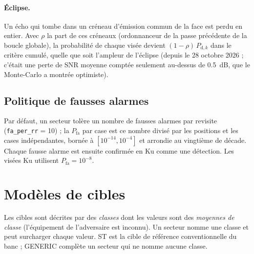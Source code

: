 \documentclass[11pt,a4paper]{article}
\newcommand{\code}[1]{\texttt{\small #1}}
\newcommand{\Pfa}{P_{\mathrm{fa}}}
\begin{document}
\paragraph{Éclipse.} Un écho qui tombe dans un créneau d'émission commun de la face est perdu en entier. Avec $\rho$ la
part de ces créneaux (ordonnanceur de la passe précédente de la boucle globale), la probabilité de chaque visée devient
$(1-\rho)\,P_{\mathrm{d},k}$ dans le critère cumulé, quelle que soit l'ampleur de l'éclipse (depuis le 28 octobre 2026 ;
c'était une perte de SNR moyenne comptée seulement au-dessus de \SI{0.5}{dB}, que le Monte-Carlo a montrée optimiste).

\subsection{Politique de fausses alarmes}
Par défaut, un secteur tolère un nombre de fausses alarmes par revisite (\code{fa\_per\_rr} = 10) ; la $\Pfa$ par case
est ce nombre divisé par les positions et les cases indépendantes, bornée à $[10^{-14}, 10^{-4}]$ et arrondie au
vingtième de décade. Chaque fausse alarme est ensuite confirmée en Ku comme une détection. Les visées Ku utilisent
$\Pfa = 10^{-8}$.

\section{Modèles de cibles}\label{sec:targets}
Les cibles sont décrites par des \emph{classes} dont les valeurs sont des \emph{moyennes de classe} (l'équipement de
l'adversaire est inconnu). Un secteur nomme une classe et peut surcharger chaque valeur. ST est la cible de référence
conventionnelle du banc ; GENERIC complète un secteur qui ne nomme aucune classe.
\end{document}
